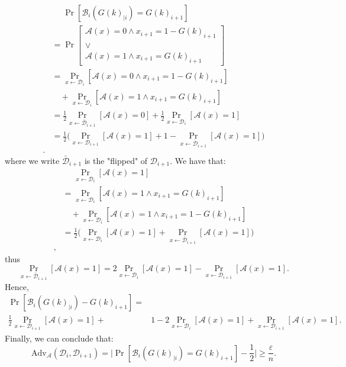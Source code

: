 \documentclass[./main]{subfiles}
\begin{document}
\begin{prv}
\begin{align*}
      &\phantom{={}}\Pr[\mathcal{B}_i(G(k)_{|i}) = G(k)_{i+1}]\\
      &= \Pr \left[
        \begin{array}{c}
          \mathcal{A}(x) = 0 \land x_{i+1} = 1 - G(k)_{i+1}\\
          \lor\\
          \mathcal{A}(x) = 1 \land x_{i+1} = G(k)_{i+1}
        \end{array}
      \right] \\
      &= \Pr_{x \gets \mathcal{D}_i} [\mathcal{A}(x) = 0 \land x_{i+1} = 1 - G(k)_{i+1}]\\
      &\quad + \Pr_{x\gets \mathcal{D}_i}[\mathcal{A}(x) = 1 \land x_{i+1} = G(k)_{i+1}]\\
      &=
      \frac{1}{2} \Pr_{x \gets \bar{\mathcal{D}}_{i+1}}[\mathcal{A}(x) = 0]
      + \frac{1}{2} \Pr_{x \gets \mathcal{D}_{i}}[\mathcal{A}(x) = 1]\\
      &= \frac{1}{2}\big(
        \Pr_{x \gets \mathcal{D}_{i+1}}[\mathcal{A}(x) = 1]
        + 1 - \Pr_{x \gets \bar{\mathcal{D}}_{i+1}}[\mathcal{A}(x) = 1]
      \big) \\
    .\end{align*}
    where we write $\bar{\mathcal{D}}_{i+1}$ is the "flipped" of $\mathcal{D}_{i+1}$.
    We have that:
    \begin{align*}
      &\phantom{={}}\Pr_{x \gets \mathcal{D}_i}[\mathcal{A}(x) = 1]\\
      &= \Pr_{x \gets \mathcal{D}_i}[\mathcal{A}(x) = 1 \land x_{i+1} = G(k)_{i+1}] \\
      &\quad+ \Pr_{x \gets \mathcal{D}_i}[\mathcal{A}(x) = 1 \land x_{i+1} = 1 - G(k)_{i+1}] \\
      &= \frac{1}{2}\big(\Pr_{x \gets \mathcal{D}_i}[\mathcal{A}(x) = 1] + \Pr_{x \gets \bar{\mathcal{D}}_{i+1}}[\mathcal{A}(x) = 1]\big) \\
    ,\end{align*}
    thus
    \[
      \Pr_{x \gets \bar{\mathcal{D}}_{i+1}}[\mathcal{A}(x) = 1] = 2 \Pr_{x \gets \mathcal{D}_i}[\mathcal{A}(x) = 1] - \Pr_{x \gets \mathcal{D}_{i+1}}[\mathcal{A}(x) = 1]
    .\]
    Hence, 
    \begin{align*}
      \Pr[\mathcal{B}_i(G(k)_{|i}) - G(k)_{i+1}] =& \\
      \frac{1}{2}\Pr_{x \gets \mathcal{D}_{i+1}}[\mathcal{A}(x) = 1] +{} &1 - 2 \Pr_{x \gets \mathcal{D}_i}[\mathcal{A}(x) = 1] + \Pr_{x \gets \mathcal{D}_{i+1}}[\mathcal{A}(x) = 1]
    .\end{align*}
    Finally, we can conclude that:
    \[
      \mathrm{Adv}_\mathcal{A}(\mathcal{D}_i, \mathcal{D}_{i+1}) = \Big|\Pr[\mathcal{B}_i(G(k)_{|i}) = G(k)_{i+1}] - \frac{1}{2}\Big| \ge \frac{\varepsilon}{n}
    .\] 
  \end{prv}
\end{document}

